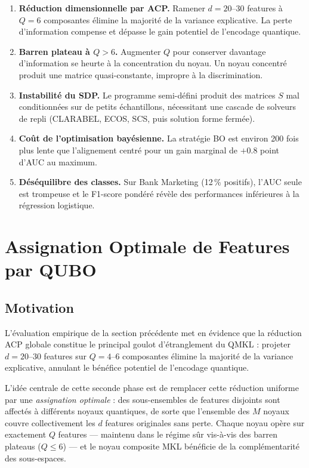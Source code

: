 \documentclass[12pt,a4paper]{article}
\begin{document}
\begin{enumerate}[label=(\roman*)]
  \item \textbf{Réduction dimensionnelle par ACP.}
  Ramener $d = 20$--30 features à $Q = 6$ composantes élimine la majorité de
  la variance explicative.
  La perte d'information compense et dépasse le gain potentiel de
  l'encodage quantique.

  \item \textbf{Barren plateau à $Q > 6$.}
  Augmenter $Q$ pour conserver davantage d'information se heurte à la
  concentration du noyau.
  Un noyau concentré produit une matrice quasi-constante, impropre à la
  discrimination.

  \item \textbf{Instabilité du SDP.}
  Le programme semi-défini produit des matrices $S$ mal conditionnées sur
  de petits échantillons, nécessitant une cascade de solveurs de repli
  (CLARABEL, ECOS, SCS, puis solution forme fermée).

  \item \textbf{Coût de l'optimisation bayésienne.}
  La stratégie BO est environ 200 fois plus lente que l'alignement centré
  pour un gain marginal de $+0.8$ point d'AUC au maximum.

  \item \textbf{Déséquilibre des classes.}
  Sur Bank Marketing (12\,\% positifs), l'AUC seule est trompeuse et le
  F1-score pondéré révèle des performances inférieures à la régression
  logistique.
\end{enumerate}

\section{Assignation Optimale de Features par QUBO}
\label{sec:v2}

\subsection{Motivation}

L'évaluation empirique de la section précédente met en évidence que la
réduction ACP globale constitue le principal goulot d'étranglement du QMKL :
projeter $d = 20$--$30$ features sur $Q = 4$--$6$ composantes élimine la
majorité de la variance explicative, annulant le bénéfice potentiel de
l'encodage quantique.

L'idée centrale de cette seconde phase est de remplacer cette réduction
uniforme par une \emph{assignation optimale} : des sous-ensembles de features
disjoints sont affectés à différents noyaux quantiques, de sorte que
l'ensemble des $M$ noyaux couvre collectivement les $d$ features originales
sans perte.
Chaque noyau opère sur exactement $Q$ features --- maintenu dans le régime
sûr vis-à-vis des barren plateaus ($Q \leq 6$) --- et le noyau composite MKL
bénéficie de la complémentarité des sous-espaces.
\end{document}
